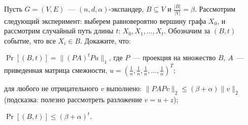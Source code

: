 Пусть $G = (V, E)$~--- $(n, d, \alpha)$-экспандер, $B \subseteq V$ и $\frac{|B|}{|V|} = \beta$. Рассмотрим следующий
эксперимент: выберем равновероятно вершину графа $X_0$, и рассмотрим случайный путь длины $t$: $X_0, X_1, \dots,
X_t$. Обозначим за $(B, t)$ событие, что все $X_i \in B$. Докажите, что:
\begin{enumcyr}
    \item $\Pr[(B, t)] = \|(PA)^tP u\|_1$, где $P$~--- проекция на множество $B$, $A$~--- приведенная матрица смежности,
    	$u = (\frac{1}{n}, \frac{1}{n}, \frac{1}{n}, \dots, \frac{1}{n})^{T}$;
    \item для любого не отрицательного $v$ выполнено: $\|PAP v\|_2 \le (\beta + \alpha) \|v\|_2$ (подсказка: полезно
	    рассмотреть разложение $v = u + z$);
    \item $\Pr[(B, t)] \le (\beta + \alpha)^t$.
\end{enumcyr}